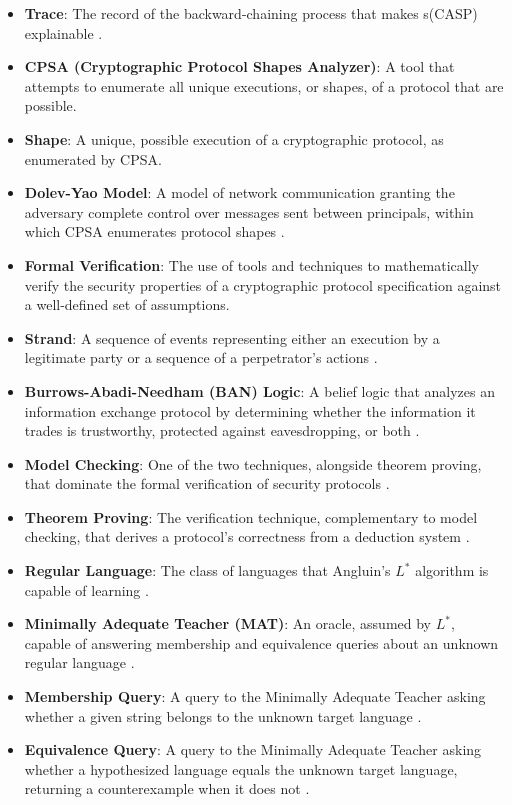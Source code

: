 \documentclass[11pt]{article}
\begin{document}
\begin{itemize}
    \item \textbf{Trace}: The record of the backward-chaining process that makes s(CASP) explainable \cite{Arias_2020}.
    \item \textbf{CPSA (Cryptographic Protocol Shapes Analyzer)}: A tool that attempts to enumerate all unique executions, or shapes, of a protocol that are possible.
    \item \textbf{Shape}: A unique, possible execution of a cryptographic protocol, as enumerated by CPSA.
    \item \textbf{Dolev-Yao Model}: A model of network communication granting the adversary complete control over messages sent between principals, within which CPSA enumerates protocol shapes \cite{1056650}.
    \item \textbf{Formal Verification}: The use of tools and techniques to mathematically verify the security properties of a cryptographic protocol specification against a well-defined set of assumptions.
    \item \textbf{Strand}: A sequence of events representing either an execution by a legitimate party or a sequence of a perpetrator's actions \cite{doi:10.3233/JCS-1999-72-304}.
    \item \textbf{Burrows-Abadi-Needham (BAN) Logic}: A belief logic that analyzes an information exchange protocol by determining whether the information it trades is trustworthy, protected against eavesdropping, or both \cite{10.1145/77648.77649}.
    \item \textbf{Model Checking}: One of the two techniques, alongside theorem proving, that dominate the formal verification of security protocols \cite{pourpouneh}.
    \item \textbf{Theorem Proving}: The verification technique, complementary to model checking, that derives a protocol's correctness from a deduction system \cite{pourpouneh}.
    \item \textbf{Regular Language}: The class of languages that Angluin's $L^*$ algorithm is capable of learning \cite{angluin1987}.
    \item \textbf{Minimally Adequate Teacher (MAT)}: An oracle, assumed by $L^*$, capable of answering membership and equivalence queries about an unknown regular language \cite{angluin1987}.
    \item \textbf{Membership Query}: A query to the Minimally Adequate Teacher asking whether a given string belongs to the unknown target language \cite{angluin1987}.
    \item \textbf{Equivalence Query}: A query to the Minimally Adequate Teacher asking whether a hypothesized language equals the unknown target language, returning a counterexample when it does not \cite{angluin1987}.

\end{itemize}
\end{document}
